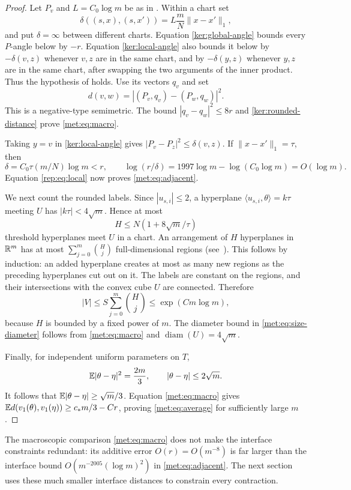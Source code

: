 \begin{proof}
Let $P_v$ and $L=C_0\log m$ be as in . Within a
chart set
\[
\delta((s,x),(s,x'))=L\frac mN\|x-x'\|_1,
\]
and put $\delta=\infty$ between different charts.
Equation \eqref{ker:global-angle} bounds every $P$-angle below by
$-r$. Equation \eqref{ker:local-angle} also bounds it below by
$-\delta(v,z)$ whenever $v,z$ are in the same chart, and by
$-\delta(y,z)$ whenever $y,z$ are in the same chart, after swapping
the two arguments of the inner product. Thus the hypothesis of
 holds. Use its vectors $q_v$ and set
\begin{equation}\label{met:eq:definition}
d(v,w)=|(P_v,q_v)-(P_w,q_w)|^2.
\end{equation}
This is a negative-type semimetric. The bound
$|q_v-q_w|^2\le8r$ and \eqref{ker:rounded-distance} prove
\eqref{met:eq:macro}.

Taking $y=v$ in \eqref{ker:local-angle} gives
$|P_v-P_z|^2\le\delta(v,z)$. If $\|x-x'\|_1=\tau$, then
\[
\delta= C_0\tau(m/N)\log m<r,
\qquad
\log(r/\delta)
=1997\log m-\log(C_0\log m)=O(\log m).
\]
Equation \eqref{rep:eq:local} now proves
\eqref{met:eq:adjacent}.

We next count the rounded labels. Since $|u_{s,i}|\le2$, a
hyperplane $\langle u_{s,i},\theta\rangle=k\tau$ meeting $U$ has
$|k\tau|<4\sqrt m$. Hence at most
\[
H\le N(1+8\sqrt m/\tau)
\]
threshold hyperplanes meet $U$ in a chart. An arrangement of $H$
hyperplanes in $\mathbb R^m$ has at most
$\sum_{j=0}^m\binom Hj$ full-dimensional regions (see~\cite{Zas75}).
This follows by
induction: an added hyperplane creates at most as many new regions
as the preceding hyperplanes cut out on it. The labels are constant
on the regions, and their intersections with the convex cube $U$
are connected. Therefore
\[
|V|\le S\sum_{j=0}^m\binom Hj\le\exp(Cm\log m),
\]
because $H$ is bounded by a fixed power of $m$. The diameter bound
in \eqref{met:eq:size-diameter} follows from
\eqref{met:eq:macro} and $\operatorname{diam}(U)=4\sqrt m$.

Finally, for independent uniform parameters on $T$,
\[
\mathbb E|\theta-\eta|^2=\frac{2m}{3},\qquad
|\theta-\eta|\le2\sqrt m.
\]
It follows that $\mathbb E|\theta-\eta|\ge\sqrt m/3$.
Equation \eqref{met:eq:macro} gives
$\mathbb E d(v_1(\theta),v_1(\eta))\ge c_*m/3-Cr$, proving
\eqref{met:eq:average} for sufficiently large $m$.
\end{proof}

The macroscopic comparison \eqref{met:eq:macro} does not make the
interface constraints redundant: its additive error $O(r)=O(m^{-8})$
is far larger than the interface bound $O(m^{-2005}(\log m)^2)$ in
\eqref{met:eq:adjacent}. The next section uses these much smaller
interface distances to constrain every contraction.
